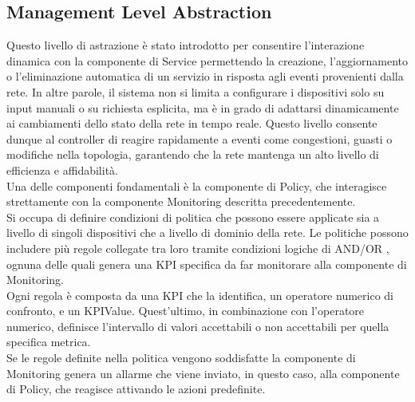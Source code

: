 \subsection{Management Level Abstraction}
Questo livello di astrazione è stato introdotto per consentire l'interazione dinamica con la componente di Service permettendo la creazione, l'aggiornamento o l'eliminazione automatica di un servizio in risposta agli eventi provenienti dalla rete.
In altre parole, il sistema non si limita a configurare i dispositivi solo su input manuali o su richiesta esplicita, ma è in grado di adattarsi dinamicamente ai cambiamenti dello stato della rete in tempo reale. 
Questo livello consente dunque al controller di reagire rapidamente a eventi come congestioni, guasti o modifiche nella topologia, garantendo che la rete mantenga un alto livello di efficienza e affidabilità.
\\Una delle componenti fondamentali è la componente di Policy, che interagisce strettamente con la componente Monitoring descritta precedentemente.
\\Si occupa di definire condizioni di politica che possono essere applicate sia a livello di singoli dispositivi che a livello di dominio della rete.
Le politiche possono includere più regole collegate tra loro tramite condizioni logiche di AND/OR \cite{D32}, ognuna delle quali genera una KPI specifica da far monitorare alla componente di Monitoring.
\\Ogni regola è composta da una KPI che la identifica, un operatore numerico di confronto, e un KPIValue.
Quest'ultimo, in combinazione con l'operatore numerico, definisce l'intervallo di valori accettabili o non accettabili per quella specifica metrica.
\\Se le regole definite nella politica vengono soddisfatte la componente di Monitoring genera un allarme che viene inviato, in questo caso, alla componente di Policy, che reagisce attivando le azioni predefinite.
